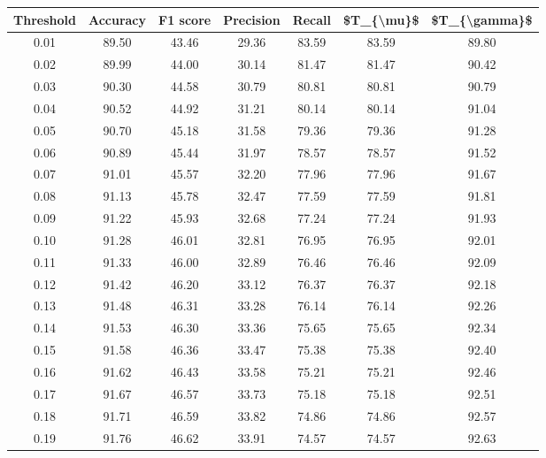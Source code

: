 \begin{tabular}{|c|c|c|c|c|c|c|}
\hline
 Threshold &  Accuracy &  F1 score &  Precision &  Recall &  \$T\_\{\textbackslash mu\}\$ &  \$T\_\{\textbackslash gamma\}\$ \\
\hline
      0.01 &     89.50 &     43.46 &      29.36 &   83.59 &      83.59 &         89.80 \\
      0.02 &     89.99 &     44.00 &      30.14 &   81.47 &      81.47 &         90.42 \\
      0.03 &     90.30 &     44.58 &      30.79 &   80.81 &      80.81 &         90.79 \\
      0.04 &     90.52 &     44.92 &      31.21 &   80.14 &      80.14 &         91.04 \\
      0.05 &     90.70 &     45.18 &      31.58 &   79.36 &      79.36 &         91.28 \\
      0.06 &     90.89 &     45.44 &      31.97 &   78.57 &      78.57 &         91.52 \\
      0.07 &     91.01 &     45.57 &      32.20 &   77.96 &      77.96 &         91.67 \\
      0.08 &     91.13 &     45.78 &      32.47 &   77.59 &      77.59 &         91.81 \\
      0.09 &     91.22 &     45.93 &      32.68 &   77.24 &      77.24 &         91.93 \\
      0.10 &     91.28 &     46.01 &      32.81 &   76.95 &      76.95 &         92.01 \\
      0.11 &     91.33 &     46.00 &      32.89 &   76.46 &      76.46 &         92.09 \\
      0.12 &     91.42 &     46.20 &      33.12 &   76.37 &      76.37 &         92.18 \\
      0.13 &     91.48 &     46.31 &      33.28 &   76.14 &      76.14 &         92.26 \\
      0.14 &     91.53 &     46.30 &      33.36 &   75.65 &      75.65 &         92.34 \\
      0.15 &     91.58 &     46.36 &      33.47 &   75.38 &      75.38 &         92.40 \\
      0.16 &     91.62 &     46.43 &      33.58 &   75.21 &      75.21 &         92.46 \\
      0.17 &     91.67 &     46.57 &      33.73 &   75.18 &      75.18 &         92.51 \\
      0.18 &     91.71 &     46.59 &      33.82 &   74.86 &      74.86 &         92.57 \\
      0.19 &     91.76 &     46.62 &      33.91 &   74.57 &      74.57 &         92.63 \\

\end{tabular}
